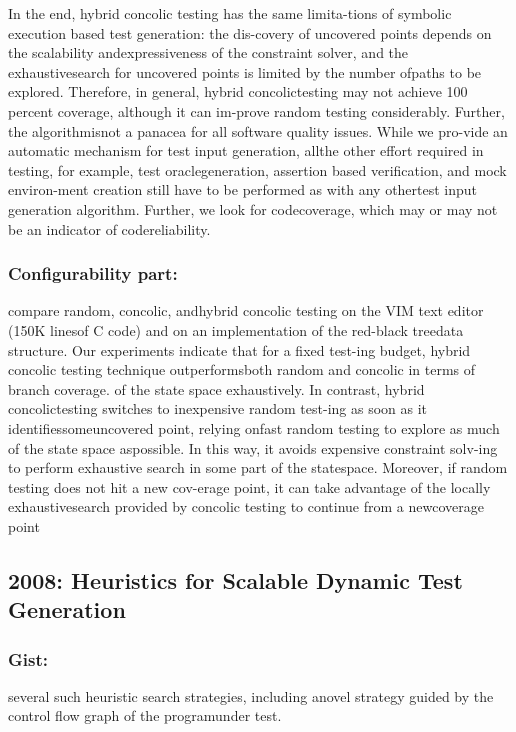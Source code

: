 \documentclass[	runningheads,
				a4paper]{llncs}
\begin{document}
In the end, hybrid concolic testing has the same limita-tions of symbolic execution based test generation:  the dis-covery of uncovered points depends on the scalability andexpressiveness of the constraint solver, and the exhaustivesearch  for  uncovered  points  is  limited  by  the  number  ofpaths to be explored. Therefore, in general, hybrid concolictesting may not achieve 100 percent coverage, although it can im-prove random testing considerably. Further, the algorithmisnot a panacea for all software quality issues. While we pro-vide an automatic mechanism for test input generation, allthe other effort required in testing, for example, test oraclegeneration, assertion based verification, and mock environ-ment creation still have to be performed as with any othertest input generation algorithm.  Further, we look for codecoverage,  which may or may not be an indicator of codereliability.

\subsubsection{Configurability part:}
compare random,  concolic,  andhybrid concolic testing on the VIM text editor (150K linesof C code) and on an implementation of the red-black treedata structure. Our experiments indicate that for a fixed test-ing budget, hybrid concolic testing technique outperformsboth random and concolic in terms of branch coverage. of the state space exhaustively. In contrast, hybrid concolictesting switches to inexpensive random test-ing as soon as it identifiessomeuncovered point, relying onfast random testing to explore as much of the state space aspossible.  In this way, it avoids expensive constraint solv-ing to perform exhaustive search in some part of the statespace. Moreover, if random testing does not hit a new cov-erage point, it can take advantage of the locally exhaustivesearch provided by concolic testing to continue from a newcoverage point

\subsection{2008: Heuristics for Scalable Dynamic Test Generation}

\subsubsection{Gist:}
several  such  heuristic  search  strategies,  including  anovel strategy guided by the control flow graph of the programunder test. 
\end{document}
